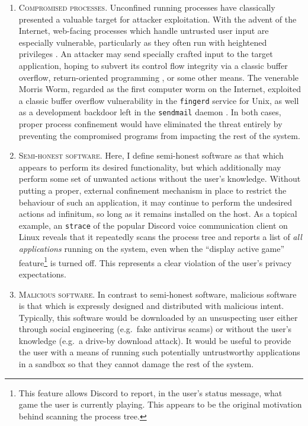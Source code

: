 \documentclass[dvipsnames, 12pt]{article}
\begin{document}
\begin{enumerate}[label=\bfseries A\arabic*., ref=A\arabic*, labelindent=2em]
    \item \label{a:1} \textsc{Compromised processes.} Unconfined running
    processes have classically presented a valuable target for attacker
    exploitation. With the advent of the Internet, web-facing processes which
    handle untrusted user input are especially vulnerable, particularly as they
    often run with heightened privileges \cite{cohen1996_secure}. An attacker
    may send specially crafted input to the target application, hoping to
    subvert its control flow integrity via a classic buffer overflow,
    return-oriented programming \cite{shacham2007_rop}, or some other means. The
    venerable Morris Worm, regarded as the first computer worm on the Internet,
    exploited a classic buffer overflow vulnerability in the \texttt{fingerd}
    service for Unix, as well as a development backdoor left in the
    \texttt{sendmail} daemon \cite{spafford1989_morris}. In both cases, proper
    process confinement would have eliminated the threat entirely by preventing
    the compromised programs from impacting the rest of the system.

    \item \label{a:2} \textsc{Semi-honest software.} Here, I define semi-honest
    software as that which appears to perform its desired functionality, but
    which additionally may perform some set of unwanted actions without the
    user's knowledge. Without putting a proper, external confinement mechanism
    in place to restrict the behaviour of such an application, it may continue
    to perform the undesired actions ad infinitum, so long as it remains
    installed on the host. As a topical example, an \texttt{strace} of the
    popular Discord \cite{discord} voice communication client on Linux reveals
    that it repeatedly scans the process tree and reports a list of \textit{all
    applications} running on the system, even when the \enquote{display active
    game} feature\footnote{This feature allows Discord to report, in the user's
    status message, what game the user is currently playing. This appears to be
    the original motivation behind scanning the process tree.} is turned off.
    This represents a clear violation of the user's privacy expectations.

    \item \label{a:3} \textsc{Malicious software.} In contrast to semi-honest
    software, malicious software is that which is expressly designed and
    distributed with malicious intent. Typically, this software would be
    downloaded by an unsuspecting user either through social engineering
    (e.g.~fake antivirus scams) or without the user's knowledge (e.g.~a drive-by
    download attack). It would be useful to provide the user with a means of
    running such potentially untrustworthy applications in a sandbox so that
    they cannot damage the rest of the system.
\end{enumerate}
\end{document}
